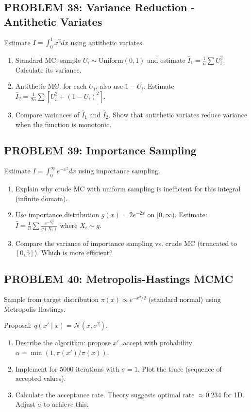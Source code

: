 \documentclass[12pt]{article}
\begin{document}
\subsection*{PROBLEM 38: Variance Reduction - Antithetic Variates}

Estimate \(I = \int_0^1 x^2 dx\) using antithetic variates.

\begin{enumerate}
\item[(a)] Standard MC: sample \(U_i \sim \text{Uniform}(0,1)\) and estimate \(\hat{I}_1 = \frac{1}{n}\sum U_i^2\). Calculate its variance.
\item[(b)] Antithetic MC: for each \(U_i\), also use \(1-U_i\). Estimate \(\hat{I}_2 = \frac{1}{2n}\sum[U_i^2 + (1-U_i)^2]\).
\item[(c)] Compare variances of \(\hat{I}_1\) and \(\hat{I}_2\). Show that antithetic variates reduce variance when the function is monotonic.
\end{enumerate}

\subsection*{PROBLEM 39: Importance Sampling}

Estimate \(I = \int_0^{\infty} e^{-x^2} dx\) using importance sampling.

\begin{enumerate}
\item[(a)] Explain why crude MC with uniform sampling is inefficient for this integral (infinite domain).
\item[(b)] Use importance distribution \(g(x) = 2e^{-2x}\) on \([0,\infty)\). Estimate: \(\hat{I} = \frac{1}{n}\sum \frac{e^{-X_i^2}}{g(X_i)}\) where \(X_i \sim g\).
\item[(c)] Compare the variance of importance sampling vs. crude MC (truncated to \([0, 5]\)). Which is more efficient?
\end{enumerate}

\subsection*{PROBLEM 40: Metropolis-Hastings MCMC}

Sample from target distribution \(\pi(x) \propto e^{-x^2/2}\) (standard normal) using Metropolis-Hastings.

Proposal: \(q(x' \mid x) = \mathcal{N}(x, \sigma^2)\).

\begin{enumerate}
\item[(a)] Describe the algorithm: propose \(x'\), accept with probability \(\alpha = \min(1, \pi(x')/\pi(x))\).
\item[(b)] Implement for 5000 iterations with \(\sigma = 1\). Plot the trace (sequence of accepted values).
\item[(c)] Calculate the acceptance rate. Theory suggests optimal rate \(\approx 0.234\) for 1D. Adjust \(\sigma\) to achieve this.
\end{enumerate}
\end{document}
